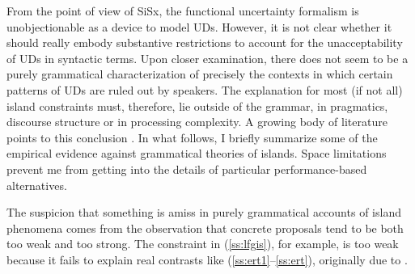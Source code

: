 \documentclass[output=paper,hidelinks]{langscibook}
\begin{document}
\begin{exe}
 \label{ss:adj}
\end{exe}

From the point of view of SiSx, the functional uncertainty formalism is unobjectionable as a device to model UDs. However, it is not clear whether it should really embody substantive restrictions to account for the unacceptability of UDs in syntactic terms. Upon closer examination, there does not seem to be a purely grammatical characterization of precisely the contexts in which certain patterns of UDs are ruled out by speakers. The explanation for most (if not all) island constraints must, therefore, lie outside of the grammar, in pragmatics, discourse structure or in processing complexity. A growing body of literature points to this conclusion \citep{hofmeister2007locality,hofmeister2010cognitive,hofmeister2013islands,kluender1991cognitive,kluender1992deriving,kluender2004subject,kluender1993bridging,sag2007processing, chaves2013expectation, chaves2014subject, chaves2019frequency, culicover2013problems, culicover2013grammar}. In what follows, I briefly summarize some of the empirical evidence against grammatical theories of islands. Space limitations prevent me from getting into the details of particular performance-based alternatives.




The suspicion that something is amiss in purely grammatical accounts of island phenomena comes from the observation that concrete proposals tend to be both too weak and too strong. The constraint in (\ref{ss:lfgis}), for example, is too weak because it fails to explain real contrasts like (\ref{ss:ert1}--\ref{ss:ert}),  originally due to \citet[84]{erteschik-shir1973on-the-nature}.

\largerpage
\begin{exe}
\ex\label{ss:ert1}
\begin{xlist}
\end{xlist}
\end{exe}

\begin{exe}
\ex\label{ss:ert}
\begin{xlist}
\end{xlist}
\end{exe}
\end{document}
